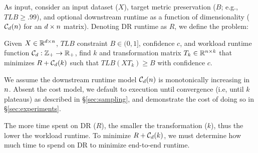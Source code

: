 As input, consider an input dataset ($X$), target metric preservation ($B$; e.g., $TLB \geq .99$), and optional downstream runtime as a function of dimensionality ($\mathcal{C}_{\color{black}d}({\color{black}n})$ for an ${\color{black}d}\times {\color{black}n}$ matrix).  
Denoting DR runtime as $R$, we define the problem:
\begin{problem}
\label{def:opt}
  Given $X \in \mathbb{R}^{{\color{black}d} \times {\color{black}n}}$, $TLB$ constraint $B \in 
  (0, 1]$, confidence $c$, and workload runtime function $\mathcal{C}_{\color{black}d}:\mathbb{Z}_{+} \rightarrow \mathbb{R}_{+}$, find $k$ and transformation
  matrix $T_k \in \mathbb{R}^{{\color{black}n} \times k}$ that minimizes $R + \mathcal{C}_{\color{black}d}(k)$
  such that $TLB(XT_k) \geq B$ with confidence $c$.
\end{problem}

We assume the downstream runtime model $\mathcal{C}_{\color{black}d}({\color{black}n})$ is monotonically increasing in ${\color{black}n}$.
Absent the cost model, we default to execution until convergence (i.e, until $k$ plateaus) as described in \S\ref{sec:sampling}, and demonstrate the cost of doing so in \S\ref{sec:experiments}.

The more time spent on DR ($R$), the smaller the transformation ($k$), thus the lower the workload runtime.
To minimize $R + \mathcal{C}_{\color{black}d}(k)$, we must determine how much time to spend on DR to minimize end-to-end runtime.
